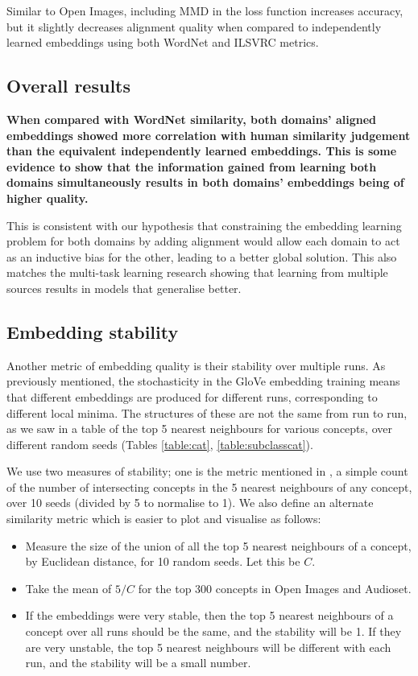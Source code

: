 Similar to Open Images, including MMD in the loss function increases accuracy, but it slightly decreases alignment quality when compared to independently learned embeddings using both WordNet and ILSVRC metrics.

\subsection{Overall results}
\textbf{When compared with WordNet similarity, both domains' aligned embeddings showed more correlation with human similarity judgement than the equivalent independently learned embeddings. This is some evidence to show that the information gained from learning both domains simultaneously results in both domains' embeddings being of higher quality.} 
 
This is consistent with our hypothesis that constraining the embedding learning problem for both domains by adding alignment would allow each domain to act as an inductive bias for the other, leading to a better global solution. This also matches the multi-task learning research showing that learning from multiple sources results in models that generalise better.


\subsection{Embedding stability}

Another metric of embedding quality is their stability over multiple runs. As previously mentioned, the stochasticity in the GloVe embedding training means that different embeddings are produced for different runs, corresponding to different local minima. The structures of these are not the same from run to run, as we saw in a table of the top 5 nearest neighbours for various concepts, over different random seeds (Tables \ref{table:cat}, \ref{table:subclasscat}). 

We use two measures of stability; one is the metric mentioned in \cite{WordEmbeddingStability}, a simple count of the number of intersecting concepts in the 5 nearest neighbours of any concept, over 10 seeds (divided by 5 to normalise to 1). We also define an alternate similarity metric which is easier to plot and visualise as follows:

\begin{itemize}
    \item Measure the size of the union of all the top 5 nearest neighbours of a concept, by Euclidean distance, for 10 random seeds. Let this be $C$. 
    \item Take the mean of $5/C$ for the top 300 concepts in Open Images and Audioset.
    \item If the embeddings were very stable, then the top 5 nearest neighbours of a concept over all runs should be the same, and the stability will be 1. If they are very unstable, the top 5 nearest neighbours will be different with each run, and the stability will be a small number. 
\end{itemize}

